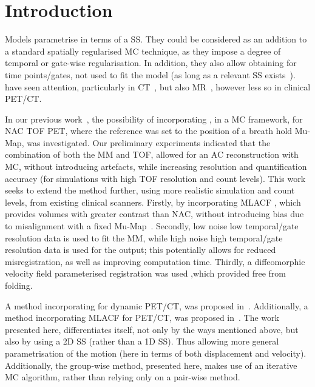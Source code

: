 \section{Introduction} \label{sec:introduction}
     Models parametrise  in terms of a \gls{SS}. They could be considered as an addition to a standard spatially regularised \gls{MC} technique, as they impose a degree of temporal or gate-wise regularisation. In addition, they also allow obtaining  for time points/gates, not used to fit the model (as long as a relevant \gls{SS} exists~\cite{McClelland2013}).  have seen attention, particularly in \acrshort{CT}~\cite{Li2007EnhancedModel}, but also \acrshort{MR}~\cite{Manke2002RespiratoryModels, Manber2016JointCorrection.}, however less so in clinical \acrshort{PET}/\acrshort{CT}.
    
    In our previous work~\cite{Whitehead2019ImpactPET, Whitehead2020PET/CTFields, Whitehead2021ComparisonMap}, the possibility of incorporating , in a \gls{MC} framework, for \gls{NAC} \gls{TOF} \acrshort{PET}, where the reference was set to the position of a breath hold \gls{Mu-Map}, was investigated. %
    Our preliminary experiments indicated that the combination of both the \gls{MM} and \gls{TOF}, allowed for an \gls{AC} reconstruction with \gls{MC}, without introducing artefacts, while increasing resolution and quantification accuracy (for simulations with high \gls{TOF} resolution and count levels). This work seeks to extend the method further, using more realistic simulation and count levels, from existing clinical scanners. Firstly, by incorporating \acrshort{MLACF}%
    , which provides volumes with greater contrast than \gls{NAC}, without introducing bias due to misalignment with a fixed \gls{Mu-Map}~\cite{Nuyts2012ML-reconstructionFactors}. Secondly, low noise low temporal/gate resolution data is used to fit the \gls{MM}, while high noise high temporal/gate resolution data is used for the output; this potentially allows for reduced misregistration, as well as improving computation time. Thirdly, a diffeomorphic velocity field parameterised registration was used ,which provided  free from folding.
    
    A method incorporating  for dynamic \acrshort{PET}/\acrshort{CT}, was proposed in~\cite{Chan2018Non-RigidPET}. Additionally, a method incorporating \acrshort{MLACF} for \acrshort{PET}/\acrshort{CT}, was proposed in~\cite{Lu2018RespiratoryData}. The work presented here, differentiates itself, not only by the ways mentioned above, but also by using a \acrshort{2D} \gls{SS} (rather than a \acrshort{1D} \gls{SS}). Thus allowing more general parametrisation of the motion (here in terms of both displacement and velocity). Additionally, the group-wise method, presented here, makes use of an iterative \gls{MC} algorithm, rather than relying only on a pair-wise method.


